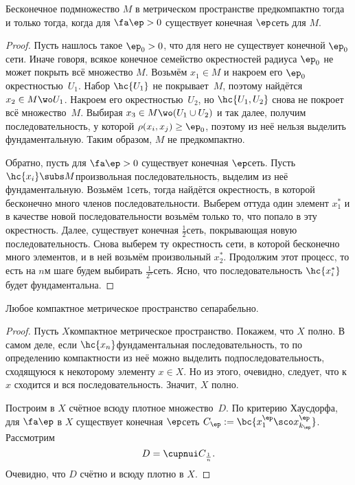 \documentclass[a4paper]{article}
\begin{document}
\begin{theorem}
Бесконечное подмножество $M$ в метрическом пространстве предкомпактно тогда и только тогда,
когда для $\fa \ep > 0$ существует конечная $\ep$\д сеть для $M$.
\end{theorem}
\begin{proof}
Пусть нашлось такое $\ep_0 > 0$, что для него не существует конечной $\ep_0$\д сети.
Иначе говоря, всякое конечное семейство окрестностей радиуса $\ep_0$ не может покрыть
всё множество $M$. Возьмём $x_1 \in M$ и накроем его $\ep_0$\д окрестностью~$U_1$. Набор
$\hc{U_1}$ не покрывает~$M$, поэтому найдётся $x_2 \in M \wo U_1$.
Накроем его окрестностью~$U_2$, но $\hc{U_1,U_2}$ снова не покроет всё множество~$M$.
Выбирая $x_3 \in M \wo (U_1 \cup U_2)$ и так далее, получим последовательность, у которой
$\rho(x_i, x_j) \ge \ep_0$, поэтому из неё нельзя выделить фундаментальную.
Таким образом, $M$ не предкомпактно.

Обратно, пусть для $\fa \ep > 0$ существует конечная $\ep$\д сеть. Пусть $\hc{x_i} \subs M$\т произвольная
последовательность, выделим из неё фундаментальную.
Возьмём $1$\д сеть, тогда найдётся окрестность, в которой бесконечно много членов последовательности.
Выберем оттуда один элемент $x_1^*$ и в качестве новой последовательности возьмём только то, что
попало в эту окрестность. Далее, существует конечная $\frac12$\д сеть, покрывающая новую
последовательность. Снова выберем ту окрестность сети, в которой бесконечно много элементов,
и в ней возьмём произвольный $x_2^*$.
Продолжим этот процесс, то есть на $n$\д м шаге будем выбирать $\frac1{2^n}$\д сеть.
Ясно, что последовательность $\hc{x_i^*}$ будет фундаментальна.
\end{proof}

\begin{imp}
Любое компактное метрическое пространство сепарабельно.
\end{imp}
\begin{proof}
Пусть $X$\т компактное метрическое пространство.
Покажем, что $X$ полно. В самом деле, если $\hc{x_n}$\т фундаментальная последовательность,
то по определению компактности из неё можно выделить подпоследовательность, сходящуюся к
некоторому элементу $x \in X$. Но из этого, очевидно, следует, что к~$x$ сходится
и вся последовательность. Значит, $X$ полно.

Построим в $X$ счётное всюду плотное множество~$D$.
По критерию Хаусдорфа, для $\fa \ep$ в $X$ существует конечная $\ep$\д сеть
$C_\ep := \bc{x^\ep_1\sco x^\ep_{k_\ep}}$.
Рассмотрим
$$D = \cupnui C_{\frac1n}.$$
Очевидно, что $D$ счётно и всюду плотно в $X$.
\end{proof}
\end{document}
